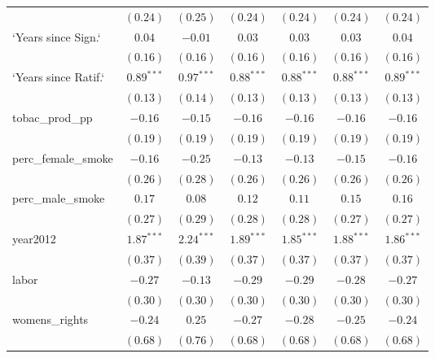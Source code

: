 \begin{table}[!h]
\begin{center}
\begin{tabular}{l c c c c c c }
                        & $(0.24)$     & $(0.25)$     & $(0.24)$     & $(0.24)$     & $(0.24)$     & $(0.24)$     \\
`Years since Sign.`     & $0.04$       & $-0.01$      & $0.03$       & $0.03$       & $0.03$       & $0.04$       \\
                        & $(0.16)$     & $(0.16)$     & $(0.16)$     & $(0.16)$     & $(0.16)$     & $(0.16)$     \\
`Years since Ratif.`    & $0.89^{***}$ & $0.97^{***}$ & $0.88^{***}$ & $0.88^{***}$ & $0.88^{***}$ & $0.89^{***}$ \\
                        & $(0.13)$     & $(0.14)$     & $(0.13)$     & $(0.13)$     & $(0.13)$     & $(0.13)$     \\
tobac\_prod\_pp         & $-0.16$      & $-0.15$      & $-0.16$      & $-0.16$      & $-0.16$      & $-0.16$      \\
                        & $(0.19)$     & $(0.19)$     & $(0.19)$     & $(0.19)$     & $(0.19)$     & $(0.19)$     \\
perc\_female\_smoke     & $-0.16$      & $-0.25$      & $-0.13$      & $-0.13$      & $-0.15$      & $-0.16$      \\
                        & $(0.26)$     & $(0.28)$     & $(0.26)$     & $(0.26)$     & $(0.26)$     & $(0.26)$     \\
perc\_male\_smoke       & $0.17$       & $0.08$       & $0.12$       & $0.11$       & $0.15$       & $0.16$       \\
                        & $(0.27)$     & $(0.29)$     & $(0.28)$     & $(0.28)$     & $(0.27)$     & $(0.27)$     \\
year2012                & $1.87^{***}$ & $2.24^{***}$ & $1.89^{***}$ & $1.85^{***}$ & $1.88^{***}$ & $1.86^{***}$ \\
                        & $(0.37)$     & $(0.39)$     & $(0.37)$     & $(0.37)$     & $(0.37)$     & $(0.37)$     \\
labor                   & $-0.27$      & $-0.13$      & $-0.29$      & $-0.29$      & $-0.28$      & $-0.27$      \\
                        & $(0.30)$     & $(0.30)$     & $(0.30)$     & $(0.30)$     & $(0.30)$     & $(0.30)$     \\
womens\_rights          & $-0.24$      & $0.25$       & $-0.27$      & $-0.28$      & $-0.25$      & $-0.24$      \\
                        & $(0.68)$     & $(0.76)$     & $(0.68)$     & $(0.68)$     & $(0.68)$     & $(0.68)$     \\

\end{tabular}
\end{center}
\end{table}
